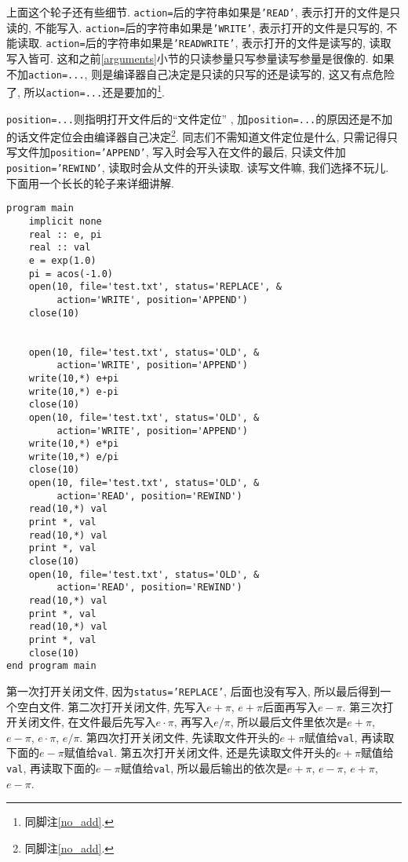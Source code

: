 上面这个轮子还有些细节. \texttt{action=}后的字符串如果是\texttt{'READ'}, 表示打开的文件是只读的, 不能写入. \texttt{action=}后的字符串如果是\texttt{'WRITE'}, 表示打开的文件是只写的, 不能读取. \texttt{action=}后的字符串如果是\texttt{'READWRITE'}, 表示打开的文件是读写的, 读取写入皆可. 这和之前\ref{arguments}小节的只读参量只写参量读写参量是很像的. 如果不加\texttt{action=...}, 则是编译器自己决定是只读的只写的还是读写的, 这又有点危险了, 所以\texttt{action=...}还是要加的\footnote{同脚注\ref{no_add}.}.

\texttt{position=...}则指明打开文件后的``文件定位'' , 加\texttt{position=...}的原因还是不加的话文件定位会由编译器自己决定\footnote{同脚注\ref{no_add}.}. 同志们不需知道文件定位是什么, 只需记得只写文件加\texttt{position='APPEND'}, 写入时会写入在文件的最后, 只读文件加\texttt{position='REWIND'}, 读取时会从文件的开头读取. 读写文件嘛, 我们选择不玩儿. 下面用一个长长的轮子来详细讲解.
\begin{lstlisting}
program main
    implicit none
    real :: e, pi
    real :: val
    e = exp(1.0)
    pi = acos(-1.0)
    open(10, file='test.txt', status='REPLACE', &
         action='WRITE', position='APPEND')
    close(10)


    open(10, file='test.txt', status='OLD', &
         action='WRITE', position='APPEND')
    write(10,*) e+pi
    write(10,*) e-pi
    close(10)
    open(10, file='test.txt', status='OLD', &
         action='WRITE', position='APPEND')
    write(10,*) e*pi
    write(10,*) e/pi
    close(10)
    open(10, file='test.txt', status='OLD', &
         action='READ', position='REWIND')
    read(10,*) val
    print *, val
    read(10,*) val
    print *, val
    close(10)
    open(10, file='test.txt', status='OLD', &
         action='READ', position='REWIND')
    read(10,*) val
    print *, val
    read(10,*) val
    print *, val
    close(10)
end program main
\end{lstlisting}
第一次打开关闭文件, 因为\texttt{status='REPLACE'}, 后面也没有写入, 所以最后得到一个空白文件. 第二次打开关闭文件, 先写入$e+\pi$, $e+\pi$后面再写入$e-\pi$. 第三次打开关闭文件, 在文件最后先写入$e\cdot\pi$, 再写入$e/\pi$, 所以最后文件里依次是$e+\pi$, $e-\pi$, $e\cdot\pi$, $e/\pi$. 第四次打开关闭文件, 先读取文件开头的$e+\pi$赋值给\texttt{val}, 再读取下面的$e-\pi$赋值给\texttt{val}. 第五次打开关闭文件, 还是先读取文件开头的$e+\pi$赋值给\texttt{val}, 再读取下面的$e-\pi$赋值给\texttt{val}, 所以最后输出的依次是$e+\pi$, $e-\pi$, $e+\pi$, $e-\pi$.

